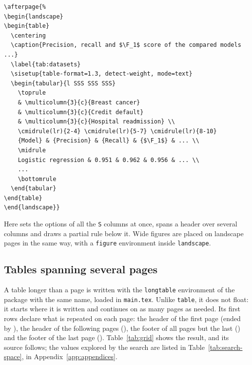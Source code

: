 \begin{Verbatim}
\afterpage{%
\begin{landscape}
\begin{table}
  \centering
  \caption{Precision, recall and $\F_1$ score of the compared models ...}
  \label{tab:datasets}
  \sisetup{table-format=1.3, detect-weight, mode=text}
  \begin{tabular}{l SSS SSS SSS}
    \toprule
    & \multicolumn{3}{c}{Breast cancer}
    & \multicolumn{3}{c}{Credit default}
    & \multicolumn{3}{c}{Hospital readmission} \\
    \cmidrule(lr){2-4} \cmidrule(lr){5-7} \cmidrule(lr){8-10}
    {Model} & {Precision} & {Recall} & {$\F_1$} & ... \\
    \midrule
    Logistic regression & 0.951 & 0.962 & 0.956 & ... \\
    ...
    \bottomrule
  \end{tabular}
\end{table}
\end{landscape}}
\end{Verbatim}
Here  sets the options of all the \texttt{S} columns at once,
 spans a header over several columns and  draws a
partial rule below it. Wide figures are placed on landscape pages in the
same way, with a \texttt{figure} environment inside \texttt{landscape}.

\subsection{Tables spanning several pages} \label{sec:longtable}

A table longer than a page is written with the \texttt{longtable}
environment of the package with the same name, loaded in
\texttt{main.tex}. Unlike \texttt{table}, it does not float: it starts where
it is written and continues on as many pages as needed. Its first rows
declare what is repeated on each page: the header of the first page (ended
by ), the header of the following pages (),
the footer of all pages but the last () and the footer of the
last page (). Table~\ref{tab:grid} shows the result, and its
source follows; the values explored by the search are listed in
Table~\ref{tab:search-space}, in Appendix~\ref{app:appendices}.


